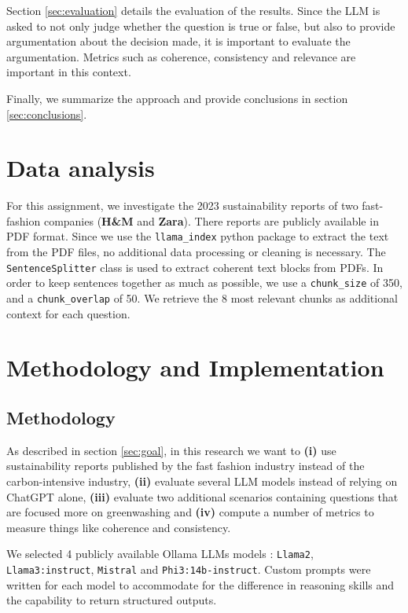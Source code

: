 \documentclass[]{article}
\begin{document}
Section \ref{sec:evaluation} details the evaluation of the results.
Since the LLM is asked to not only judge whether the question is true or false, but also to provide argumentation about the decision made, it is important to evaluate the argumentation.
Metrics such as coherence, consistency and relevance are important in this context.

Finally, we summarize the approach and provide conclusions in section \ref{sec:conclusions}.

\section{Data analysis} \label{sec:data analysis}

For this assignment, we investigate the 2023 sustainability reports of two fast-fashion companies (\textbf{H\&M} and \textbf{Zara}).
There reports are publicly available in PDF format.
Since we use the \texttt{llama\_index} python package to extract the text from the PDF files, no additional data processing or cleaning is necessary.
The \texttt{SentenceSplitter} class is used to extract coherent text blocks from PDFs.
In order to keep sentences together as much as possible, we use a \texttt{chunk\_size} of 350, and a \texttt{chunk\_overlap} of 50.
We retrieve the 8 most relevant chunks as additional context for each question.

\section{Methodology and Implementation} \label{sec:methodology}

\subsection{Methodology}

As described in section \ref{sec:goal}, in this research we want to \textbf{(i)} use sustainability reports published by the fast fashion industry instead of the carbon-intensive industry, \textbf{(ii)} evaluate several LLM models instead of relying on ChatGPT alone, \textbf{(iii)} evaluate two additional scenarios containing questions that are focused more on greenwashing and \textbf{(iv)} compute a number of metrics to measure things like coherence and consistency.

We selected 4 publicly available Ollama LLMs models : \texttt{Llama2}, \texttt{Llama3:instruct}, \texttt{Mistral} and \texttt{Phi3:14b-instruct}.
Custom prompts were written for each model to accommodate for the difference in reasoning skills and the capability to return structured outputs.
\end{document}
